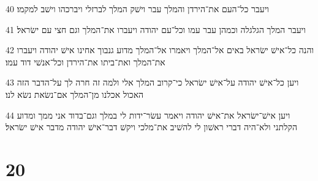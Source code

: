 \par 40 ויעבר כל־העם את־הירדן והמלך עבר וישׁק המלך לברזלי ויברכהו וישׁב למקמו׃
\par 41 ויעבר המלך הגלגלה וכמהן עבר עמו וכל־עם יהודה ויעברו את־המלך וגם חצי עם ישׂראל׃
\par 42 והנה כל־אישׁ ישׂראל באים אל־המלך ויאמרו אל־המלך מדוע גנבוך אחינו אישׁ יהודה ויעברו את־המלך ואת־ביתו את־הירדן וכל־אנשׁי דוד עמו׃
\par 43 ויען כל־אישׁ יהודה על־אישׁ ישׂראל כי־קרוב המלך אלי ולמה זה חרה לך על־הדבר הזה האכול אכלנו מן־המלך אם־נשׂאת נשׂא לנו׃
\par 44 ויען אישׁ־ישׂראל את־אישׁ יהודה ויאמר עשׂר־ידות לי במלך וגם־בדוד אני ממך ומדוע הקלתני ולא־היה דברי ראשׁון לי להשׁיב את־מלכי ויקשׁ דבר־אישׁ יהודה מדבר אישׁ ישׂראל׃

\chapter{20}

